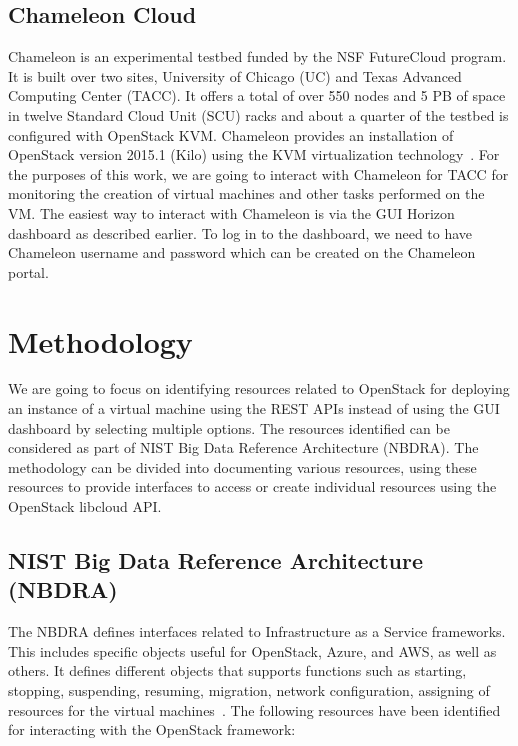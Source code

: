 \subsection{Chameleon Cloud}
Chameleon is an experimental testbed funded by the NSF FutureCloud program. It
is built over two sites, University of Chicago (UC) and Texas Advanced
Computing Center (TACC). It offers a total of over 550 nodes and 5 PB of space
in twelve Standard Cloud Unit (SCU) racks and about a quarter of the testbed 
is configured with OpenStack KVM. Chameleon provides an installation of 
OpenStack version 2015.1 (Kilo) using the KVM virtualization
technology~\cite{hid-sp18-516-las-handbook}. For the purposes of this work, 
we are going to interact with Chameleon for TACC for monitoring the creation 
of virtual machines and other tasks performed on the VM. The easiest way to 
interact with Chameleon is via the GUI Horizon dashboard as described earlier. 
To log in to the dashboard, we need to have Chameleon username and password 
which can be created on the Chameleon portal. 

\section{Methodology}
We are going to focus on identifying resources related to OpenStack for
deploying an instance of a virtual machine using the REST APIs instead of
using the GUI dashboard by selecting multiple options. The resources 
identified can be considered as part of NIST Big Data Reference 
Architecture (NBDRA). The methodology can be divided into documenting various
resources, using these resources to provide interfaces to access or create
individual resources using the OpenStack libcloud API.

\subsection{NIST Big Data Reference Architecture (NBDRA)}
The NBDRA defines interfaces related to Infrastructure as a Service frameworks.
This includes specific objects useful for OpenStack, Azure, and AWS, as well as
others. It defines different objects that supports functions such as starting,
stopping, suspending, resuming, migration, network configuration, assigning of
resources for the virtual machines~\cite{hid-sp18-516-nist-vol8}. The 
following resources have been identified for interacting with the OpenStack 
framework:

